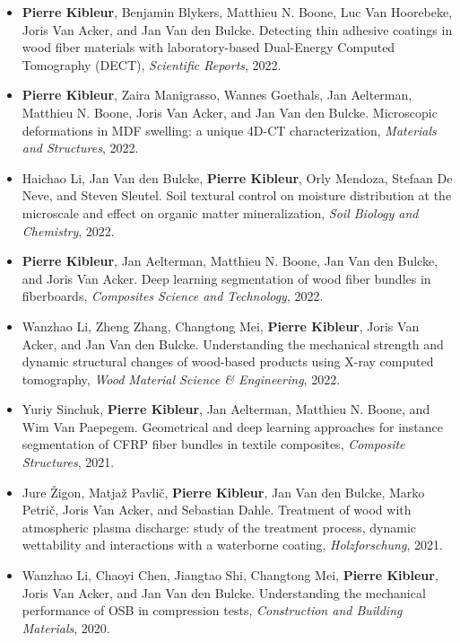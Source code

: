 \documentclass[oneside, english, 10pt, a4paper]{memoir}
\begin{document}
\begin{itemize}    	    	
	\item \textbf{Pierre Kibleur}, Benjamin Blykers, Matthieu N. Boone, Luc Van Hoorebeke, Joris Van Acker, and Jan Van den Bulcke. Detecting thin adhesive coatings in wood fiber materials with laboratory-based Dual-Energy Computed Tomography (DECT), \emph{Scientific Reports}, 2022.
	
	\item  {\textbf{Pierre Kibleur}, Zaira Manigrasso, Wannes Goethals, Jan Aelterman, Matthieu N. Boone, Joris Van Acker, and Jan Van den Bulcke}. {Microscopic deformations in MDF swelling: a unique 4D-CT characterization}, \emph{Materials and Structures}, 2022.
	
	\item Haichao Li, Jan Van den Bulcke, \textbf{Pierre Kibleur}, Orly Mendoza, Stefaan De Neve, and Steven Sleutel. Soil textural control on moisture distribution at the microscale and effect on organic matter mineralization, \emph{Soil Biology and Chemistry}, 2022.
	
	\item  {\textbf{Pierre Kibleur}, Jan Aelterman, Matthieu N. Boone, Jan Van den Bulcke, and Joris Van Acker}. {Deep learning segmentation of wood fiber bundles in fiberboards}, \emph{Composites Science and Technology},  2022.
	
	\item {Wanzhao Li, Zheng Zhang, Changtong Mei, \textbf{Pierre Kibleur}, Joris Van Acker, and Jan Van den Bulcke}. {Understanding the mechanical strength and dynamic structural changes of wood-based products using X-ray computed tomography}, \emph{Wood Material Science {\&} Engineering}, 2022.
	
	\item {Yuriy Sinchuk, \textbf{Pierre Kibleur}, Jan Aelterman, Matthieu N. Boone, and Wim Van Paepegem}. {Geometrical and deep learning approaches for instance segmentation of CFRP fiber bundles in textile composites}, \emph{Composite Structures}, 2021.
	
	\item {Jure \v{Z}}igon, Matja{\v{z}} Pavli{\v{c}}, \textbf{Pierre Kibleur}, Jan Van den Bulcke, Marko Petri{\v{c}}, Joris Van Acker, and Sebastian Dahle. {Treatment of wood with atmospheric plasma discharge: study of the treatment process, dynamic wettability and interactions with a waterborne coating}, \emph{{Holzforschung}}, 2021.
	
	\item  {Wanzhao Li, Chaoyi Chen, Jiangtao Shi, Changtong Mei, \textbf{Pierre Kibleur}, Joris Van Acker, and Jan Van den Bulcke}. {Understanding the mechanical performance of OSB in compression tests}, \emph{Construction and Building Materials}, 2020.
	

\end{itemize}
\end{document}
